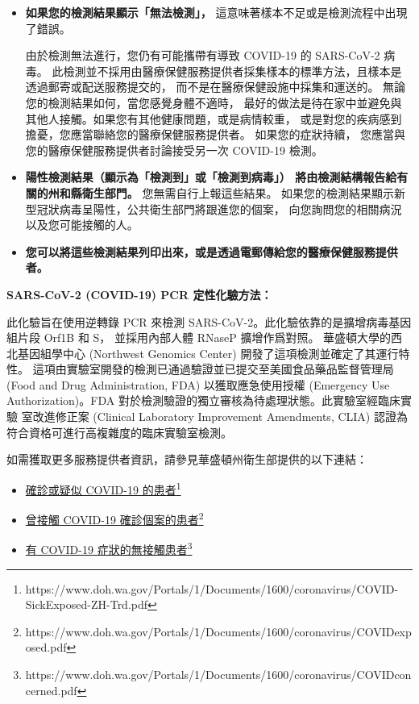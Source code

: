 \documentclass[10pt]{article}
\newcommand{\link}[2]{\href{#1}{#2}\footnote{#1}}
\begin{document}
\begin{itemize}
\item

  \textbf{如果您的檢測結果顯示「無法檢測」，} 這意味著樣本不足或是檢測流程中出現了錯誤。

  由於檢測無法進行，您仍有可能攜帶有導致 COVID-19 的 SARS-CoV-2 病毒。
  此檢測並不採用由醫療保健服務提供者採集樣本的標準方法，且樣本是透過郵寄或配送服務提交的，
  而不是在醫療保健設施中採集和運送的。 無論您的檢測結果如何，當您感覺身體不適時，
  最好的做法是待在家中並避免與其他人接觸。如果您有其他健康問題，或是病情較重，
  或是對您的疾病感到擔憂，您應當聯絡您的醫療保健服務提供者。 如果您的症狀持續，
  您應當與您的醫療保健服務提供者討論接受另一次 COVID-19 檢測。

\item

  \textbf{陽性檢測結果（顯示為「檢測到」或「檢測到病毒」）
  將由檢測結構報告給有關的州和縣衛生部門。} 您無需自行上報這些結果。
  如果您的檢測結果顯示新型冠狀病毒呈陽性，公共衛生部門將跟進您的個案，
  向您詢問您的相關病況以及您可能接觸的人。

\item

  \textbf{您可以將這些檢測結果列印出來，或是透過電郵傳給您的醫療保健服務提供者。}

\end{itemize}

\bigskip
\textbf{SARS-CoV-2 (COVID-19) PCR 定性化驗方法：}

此化驗旨在使用逆轉錄 PCR 來檢測 SARS-CoV-2。此化驗依靠的是擴增病毒基因組片段 Orf1B 和 S，
並採用內部人體 RNaseP 擴增作爲對照。 華盛頓大學的西北基因組學中心 (Northwest Genomics
Center) 開發了這項檢測並確定了其運行特性。
這項由實驗室開發的檢測已通過驗證並已提交至美國食品藥品監督管理局 (Food and Drug
Administration, FDA) 以獲取應急使用授權 (Emergency Use Authorization)。FDA
對於檢測驗證的獨立審核為待處理狀態。此實驗室經臨床實驗 室改進修正案 (Clinical Laboratory
Improvement Amendments, CLIA) 認證為符合資格可進行高複雜度的臨床實驗室檢測。

如需獲取更多服務提供者資訊，請參見華盛頓州衛生部提供的以下連結：

\begin{itemize}
\item

  \link{https://www.doh.wa.gov/Portals/1/Documents/1600/coronavirus/COVID-SickExposed-ZH-Trd.pdf}{確診或疑似
  COVID-19 的患者}

\item

  \link{https://www.doh.wa.gov/Portals/1/Documents/1600/coronavirus/COVIDexposed.pdf}{曾接觸
  COVID-19 確診個案的患者}

\item

  \link{https://www.doh.wa.gov/Portals/1/Documents/1600/coronavirus/COVIDconcerned.pdf}{有
  COVID-19 症狀的無接觸患者}

\end{itemize}
\end{document}
